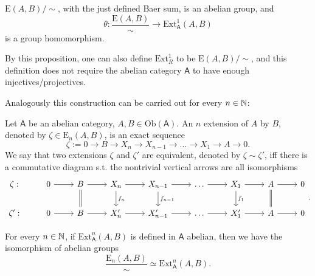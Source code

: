 \begin{prop}
	$\mathrm{E}(A,B)/\sim$, with the just defined Baer sum, is an abelian group,
	and 
	\begin{equation}
		\theta: \frac{\mathrm{E}(A,B)}{\sim} \to \mathrm{Ext}^{ 1}_{ \mathsf{A}} \left( A, B \right)
	\end{equation} 
	is a group homomorphism.
\end{prop} 
By this proposition, one can also define $\mathrm{Ext}^1_R$
to be $\mathrm{E}(A,B)/\sim$, and this definition does not require the 
abelian category $\mathsf{A}$ to have enough injectives/projectives.

Analogously this construction can be carried out for every $n \in \mathbb{N}$:
\begin{defn}[$n$ extension]
	Let $\mathsf{A}$ be an abelian category, $A,B \in \mathrm{Ob} \left(\mathsf{A}\right)$.
	An $n$ extension of $A$ by $B$, denoted by $\zeta \in \mathrm{E}_n(A,B)$, is an exact sequence
	\begin{equation}
		\zeta := 0 \to B \to X_n \to X_{n-1} \to \ldots \to X_1 \to A \to 0
	.\end{equation} 
	We say that two extensions $\zeta$ and $\zeta'$ are equivalent, denoted by $\zeta \sim \zeta'$,
	iff there is a commutative diagram s.t. the nontrivial vertical arrows are all isomorphisms
	\begin{equation}
	\begin{tikzcd}
		\zeta : &
		0 \arrow[r, "", rightarrow] &
		B \arrow[r, "", rightarrow] \arrow[d, "", equal] &
		X_n \arrow[r, "", rightarrow] \arrow[d, "f_n", rightarrow] &
		X_{n-1} \arrow[r, "", rightarrow] \arrow[d, "f_{n-1}", rightarrow] &
		\ldots \arrow[r, "", rightarrow] &
		X_1 \arrow[r, "", rightarrow] \arrow[d, "f_1", rightarrow] &
		A \arrow[r, "", rightarrow] \arrow[d, "", equal] &
		0\\
		\zeta' : &
		0 \arrow[r, "", rightarrow] &
		B \arrow[r, "", rightarrow] &
		X'_n \arrow[r, "", rightarrow] &
		X'_{n-1} \arrow[r, "", rightarrow] &
		\ldots \arrow[r, "", rightarrow] &
		X'_1 \arrow[r, "", rightarrow] &
		A \arrow[r, "", rightarrow] &
		0
	\end{tikzcd}
	.\end{equation} 
\end{defn}

\begin{prop}
	For every $n \in \mathbb{N}$, if $\mathrm{Ext}^{ n}_{ \mathsf{A}} \left( A, B \right)$ is defined
	in $\mathsf{A}$ abelian,
	then we have the isomorphism of abelian groups
	\begin{equation}
		\frac{\mathrm{E}_n(A,B)}{\sim} \simeq
		\mathrm{Ext}^{ n}_{ \mathsf{A}} \left( A, B \right)
	.\end{equation} 
\end{prop} 

